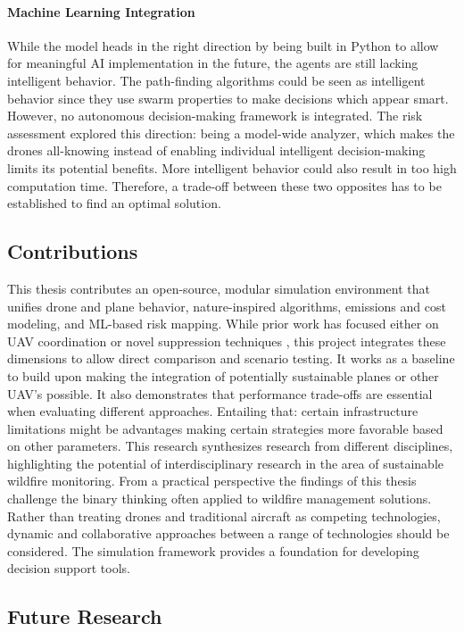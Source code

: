 \documentclass[11pt, a4paper]{article}
\begin{document}
\paragraph{Machine Learning Integration} While the model heads in the right direction by being built in Python to allow for meaningful AI implementation in the future, the agents are still lacking intelligent behavior. The path-finding algorithms could be seen as intelligent behavior since they use swarm properties to make decisions which appear smart. However, no autonomous decision-making framework is integrated. The risk assessment explored this direction: being a model-wide analyzer, which makes the drones all-knowing instead of enabling individual intelligent decision-making limits its potential benefits. More intelligent behavior could also result in too high computation time. Therefore, a trade-off between these two opposites has to be established to find an optimal solution.

\subsection{Contributions}
This thesis contributes an open-source, modular simulation environment that unifies drone and plane behavior, nature-inspired algorithms, emissions and cost modeling, and ML-based risk mapping. While prior work has focused either on UAV coordination \citep{Afghah2019} or novel suppression techniques \citep{fireBalls}, this project integrates these dimensions to allow direct comparison and scenario testing. It works as a baseline to build upon making the integration of potentially sustainable planes or other UAV's possible. It also demonstrates that performance trade-offs are essential when evaluating different approaches. Entailing that: certain infrastructure limitations might be advantages making certain strategies more favorable based on other parameters. This research synthesizes research from different disciplines, highlighting the potential of interdisciplinary research in the area of sustainable wildfire monitoring.
From a practical perspective the findings of this thesis challenge the binary thinking often applied to wildfire management solutions. Rather than treating drones and traditional aircraft as competing technologies, dynamic and collaborative approaches between a range of technologies should be considered.
The simulation framework provides a foundation for developing decision support tools.

\subsection{Future Research}
\end{document}
